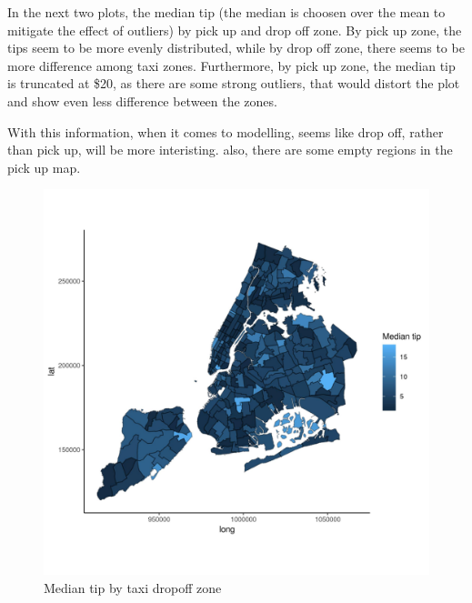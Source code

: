 \documentclass[11pt]{article}
\begin{document}
In the next two plots, the median tip (the median is choosen over the mean
to mitigate the effect of outliers) by pick up and drop off zone. By pick up
zone, the tips seem to be more evenly distributed, while by drop off zone,
there seems to be more difference among taxi zones. Furthermore, by pick up
zone, the median tip is truncated at \$20, as there are some strong outliers,
that would distort the plot and show even less difference between the zones.

With this information, when it comes to modelling, seems like drop off, rather
than pick up, will be more interisting. also, there are some empty regions in the
pick up map.

\begin{figure}[htbp]
\centering
\includegraphics[width=.9\linewidth]{./plots/destinationTipMap.jpg}
\caption{\label{fig:org015c549}
Median tip by taxi dropoff zone}
\end{figure}
\end{document}
